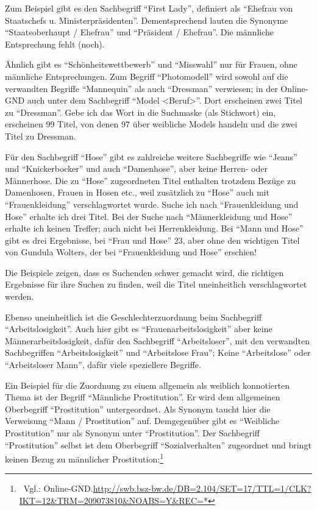 \documentclass[a4paper,
fontsize=11pt,
oneside,
numbers=noperiodatend,
parskip=half-,
bibliography=totoc,
final
]{scrartcl}
\begin{document}
Zum Beispiel gibt es den Sachbegriff \enquote{First Lady}, definiert als
\enquote{Ehefrau von Staatschefs u. Ministerpräsidenten}.
Dementsprechend lauten die Synonyme \enquote{Staatsoberhaupt / Ehefrau}
und \enquote{Präsident / Ehefrau}. Die männliche Entsprechung fehlt
(noch).

Ähnlich gibt es \enquote{Schönheitswettbewerb} und \enquote{Misswahl}
nur für Frauen, ohne männliche Entsprechungen. Zum Begriff
\enquote{Photomodell} wird sowohl auf die verwandten Begriffe
\enquote{Mannequin} als auch \enquote{Dressman} verwiesen; in der
Online-GND auch unter dem Sachbegriff \enquote{Model
\textless{}Beruf\textgreater{}}. Dort erscheinen zwei Titel zu
\enquote{Dressman}. Gebe ich das Wort in die Suchmaske (als Stichwort)
ein, erscheinen 99 Titel, von denen 97 über weibliche Models handeln und
die zwei Titel zu Dressman.

Für den Sachbegriff \enquote{Hose} gibt es zahlreiche weitere
Sachbegriffe wie \enquote{Jeans} und \enquote{Knickerbocker} und auch
\enquote{Damenhose}, aber keine Herren- oder Männerhose. Die zu
\enquote{Hose} zugeordneten Titel enthalten trotzdem Bezüge zu
Damenhosen, Frauen in Hosen etc., weil zusätzlich zu \enquote{Hose} auch
mit \enquote{Frauenkleidung} verschlagwortet wurde. Suche ich nach
\enquote{Frauenkleidung und Hose} erhalte ich drei Titel. Bei der Suche
nach \enquote{Männerkleidung und Hose} erhalte ich keinen Treffer; auch
nicht bei Herrenkleidung. Bei \enquote{Mann und Hose} gibt es drei
Ergebnisse, bei \enquote{Frau und Hose} 23, aber ohne den wichtigen
Titel von Gundula Wolters, der bei \enquote{Frauenkleidung und Hose}
erschien!

Die Beispiele zeigen, dass es Suchenden schwer gemacht wird, die
richtigen Ergebnisse für ihre Suchen zu finden, weil die Titel
uneinheitlich verschlagwortet werden.

Ebenso uneinheitlich ist die Geschlechterzuordnung beim Sachbegriff
\enquote{Arbeitslosigkeit}. Auch hier gibt es
\enquote{Frauenarbeitslosigkeit} aber keine Männerarbeitslosigkeit,
dafür den Sachbegriff \enquote{Arbeitsloser}, mit den verwandten
Sachbegriffen \enquote{Arbeitslosigkeit} und \enquote{Arbeitslose Frau};
Keine \enquote{Arbeitslose} oder \enquote{Arbeitsloser Mann}, dafür
viele speziellere Begriffe.

Ein Beispiel für die Zuordnung zu einem allgemein als weiblich
konnotierten Thema ist der Begriff \enquote{Männliche Prostitution}. Er
wird dem allgemeinen Oberbegriff \enquote{Prostitution} untergeordnet.
Als Synonym taucht hier die Verweisung \enquote{Mann / Prostitution}
auf. Demgegenüber gibt es \enquote{Weibliche Prostitution} nur als
Synonym unter \enquote{Prostitution}. Der Sachbegriff
\enquote{Prostitution} selbst ist dem Oberbegriff
\enquote{Sozialverhalten} zugeordnet und bringt keinen Bezug zu
männlicher Prostitution:\footnote{~Vgl.:
  Online-GND.\url{http://swb.bsz-bw.de/DB=2.104/SET=17/TTL=1/CLK?IKT=12\&TRM=209073810\&NOABS=Y\&REC=*}}
\end{document}

